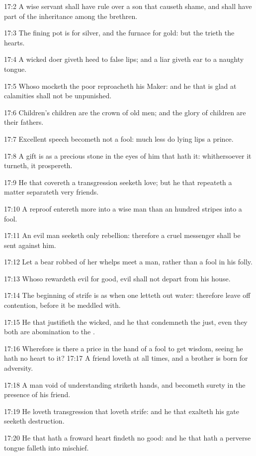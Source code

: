 17:2 A wise servant shall have rule over a son that causeth shame, and shall have part of the inheritance among the brethren.

17:3 The fining pot is for silver, and the furnace for gold: but the \LORD trieth the hearts.

17:4 A wicked doer giveth heed to false lips; and a liar giveth ear to a naughty tongue.

17:5 Whoso mocketh the poor reproacheth his Maker: and he that is glad at calamities shall not be unpunished.

17:6 Children's children are the crown of old men; and the glory of children are their fathers.

17:7 Excellent speech becometh not a fool: much less do lying lips a prince.

17:8 A gift is as a precious stone in the eyes of him that hath it: whithersoever it turneth, it prospereth.

17:9 He that covereth a transgression seeketh love; but he that repeateth a matter separateth very friends.

17:10 A reproof entereth more into a wise man than an hundred stripes into a fool.

17:11 An evil man seeketh only rebellion: therefore a cruel messenger shall be sent against him.

17:12 Let a bear robbed of her whelps meet a man, rather than a fool in his folly.

17:13 Whoso rewardeth evil for good, evil shall not depart from his house.

17:14 The beginning of strife is as when one letteth out water: therefore leave off contention, before it be meddled with.

17:15 He that justifieth the wicked, and he that condemneth the just, even they both are abomination to the \LORD.

17:16 Wherefore is there a price in the hand of a fool to get wisdom, seeing he hath no heart to it?  17:17 A friend loveth at all times, and a brother is born for adversity.

17:18 A man void of understanding striketh hands, and becometh surety in the presence of his friend.

17:19 He loveth transgression that loveth strife: and he that exalteth his gate seeketh destruction.

17:20 He that hath a froward heart findeth no good: and he that hath a perverse tongue falleth into mischief.


